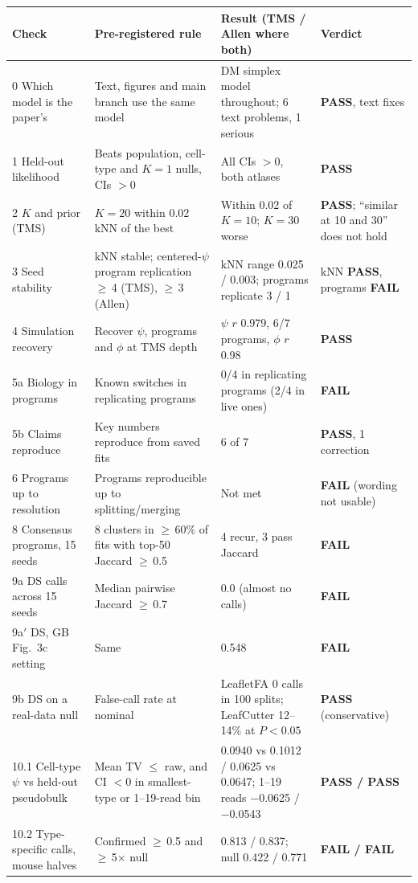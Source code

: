 \documentclass[10pt]{article}
\newcommand{\m}{$-$}
\newcommand{\gee}{$\geq$\,}
\begin{document}
\scriptsize
\begin{longtable}{L{25mm}L{44mm}L{68mm}L{24mm}}
\toprule
Check & Pre-registered rule & Result (TMS / Allen where both) & Verdict \\
\midrule
{} Which model is the paper's & Text, figures and main branch use the same model & DM simplex model throughout; 6 text problems, 1 serious & \textbf{PASS}, text fixes \\
1 Held-out likelihood & Beats population, cell-type and $K{=}1$ nulls, CIs $>0$ & All CIs $>0$, both atlases & \textbf{PASS} \\
2 $K$ and prior (TMS) & $K{=}20$ within 0.02 kNN of the best & Within 0.02 of $K{=}10$; $K{=}30$ worse & \textbf{PASS}; ``similar at 10 and 30'' does not hold \\
3 Seed stability & kNN stable; centered-$\psi$ program replication \gee4 (TMS), \gee3 (Allen) & kNN range 0.025 / 0.003; programs replicate 3 / 1 & kNN \textbf{PASS}, programs \textbf{FAIL} \\
4 Simulation recovery & Recover $\psi$, programs and $\phi$ at TMS depth & $\psi$ $r$ 0.979, 6/7 programs, $\phi$ $r$ 0.98 & \textbf{PASS} \\
5a Biology in programs & Known switches in replicating programs & 0/4 in replicating programs (2/4 in live ones) & \textbf{FAIL} \\
5b Claims reproduce & Key numbers reproduce from saved fits & 6 of 7 & \textbf{PASS}, 1 correction \\
6 Programs up to resolution & Programs reproducible up to splitting/merging & Not met & \textbf{FAIL} (wording not usable) \\
8 Consensus programs, 15 seeds & 8 clusters in \gee60\% of fits with top-50 Jaccard \gee0.5 & 4 recur, 3 pass Jaccard & \textbf{FAIL} \\
9a DS calls across 15 seeds & Median pairwise Jaccard \gee0.7 & 0.0 (almost no calls) & \textbf{FAIL} \\
9a$'$ DS, GB Fig.\ 3c setting & Same & 0.548 & \textbf{FAIL} \\
9b DS on a real-data null & False-call rate at nominal & LeafletFA 0 calls in 100 splits; LeafCutter 12--14\% at $P<0.05$ & \textbf{PASS} (conservative) \\
10.1 Cell-type $\psi$ vs held-out pseudobulk & Mean TV $\leq$ raw, and CI $<0$ in smallest-type or 1--19-read bin & 0.0940 vs 0.1012 / 0.0625 vs 0.0647; 1--19 reads \m0.0625 / \m0.0543 & \textbf{PASS / PASS} \\
10.2 Type-specific calls, mouse halves & Confirmed \gee0.5 and \gee5$\times$ null & 0.813 / 0.837; null 0.422 / 0.771 & \textbf{FAIL / FAIL} \\

\end{longtable}
\end{document}
